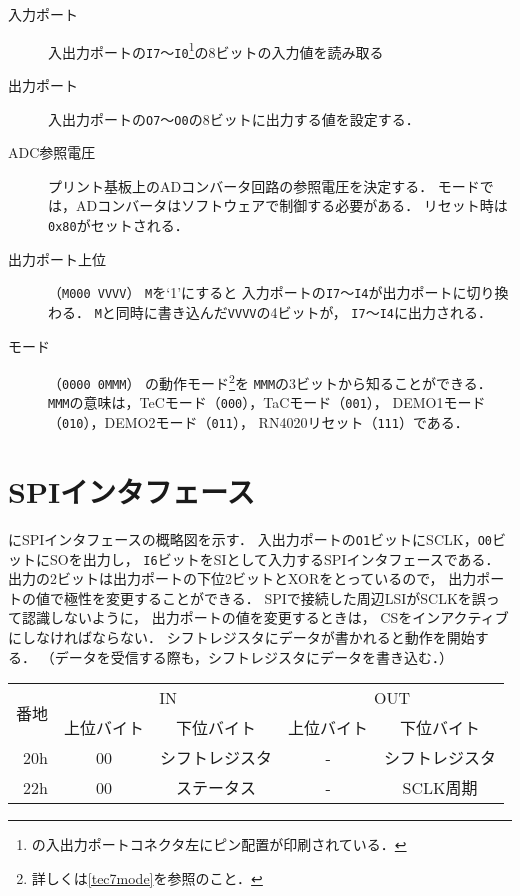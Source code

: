 \begin{description}
\item[入力ポート]
  入出力ポートの\texttt{I7}〜\texttt{I0}\footnote{
    の入出力ポートコネクタ左にピン配置が印刷されている．
  }の8ビットの入力値を読み取る
\item[出力ポート]
  入出力ポートの\texttt{O7}〜\texttt{O0}の8ビットに出力する値を設定する．
\item[ADC参照電圧]
  プリント基板上のADコンバータ回路の参照電圧を決定する．
  {\tac}モードでは，ADコンバータはソフトウェアで制御する必要がある．
  リセット時は\texttt{0x80}がセットされる．
\item[出力ポート上位]（\texttt{M000 VVVV}）
  \texttt{M}を`1'にすると
  入力ポートの\texttt{I7}〜\texttt{I4}が出力ポートに切り換わる．
  \texttt{M}と同時に書き込んだ\texttt{VVVV}の4ビットが，
  \texttt{I7}〜\texttt{I4}に出力される．
\item[モード]（\texttt{0000 0MMM}）
  {\tecS}の動作モード\footnote{詳しくは\ref{tec7mode}を参照のこと．}を
  \texttt{MMM}の3ビットから知ることができる．
  \texttt{MMM}の意味は，TeCモード（\texttt{000}），TaCモード（\texttt{001}），
  DEMO1モード（\texttt{010}），DEMO2モード（\texttt{011}），
  RN4020リセット（\texttt{111}）である．
\end{description}

\section{SPIインタフェース}

にSPIインタフェースの概略図を示す．
入出力ポートの\texttt{O1}ビットにSCLK，\texttt{O0}ビットにSOを出力し，
\texttt{I6}ビットをSIとして入力するSPIインタフェースである．
出力の2ビットは出力ポートの下位2ビットとXORをとっているので，
出力ポートの値で極性を変更することができる．
SPIで接続した周辺LSIがSCLKを誤って認識しないように，
出力ポートの値を変更するときは，
CSをインアクティブにしなければならない．
シフトレジスタにデータが書かれると動作を開始する．
（データを受信する際も，シフトレジスタにデータを書き込む．）


\begin{center}
  \small\begin{tabular}{| r | c | c || c | c |}\hline
    \multirow{2}{*}{番地}
    & \multicolumn{2}{c||}{IN}
    & \multicolumn{2}{c|}{OUT}
    \\\cline{2-5}
         & 上位バイト & 下位バイト & 上位バイト & 下位バイト
    \\\hline\hline
    20h  &  00 & シフトレジスタ
         &  -  & シフトレジスタ \\\hline
    22h  &  00 & ステータス
         &  -  & SCLK周期       \\\hline
  \end{tabular}
\end{center}

